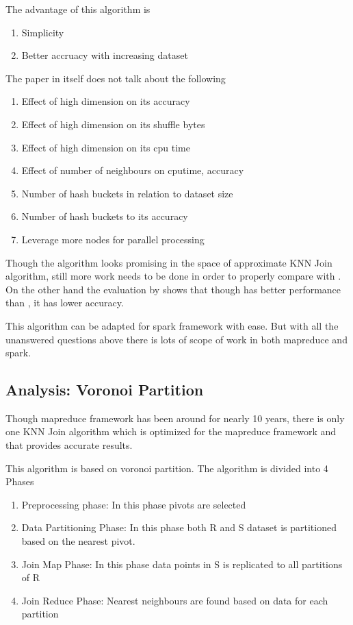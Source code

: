 \documentclass[conference]{IEEEtran}
\begin{document}
The advantage of this algorithm is
\begin{enumerate}
\item Simplicity
\item Better accruacy with increasing dataset
\end{enumerate}

\bigskip

The paper in itself does not talk about the following
\begin{enumerate}
\item Effect of high dimension on its accuracy
\item Effect of high dimension on its shuffle bytes
\item Effect of high dimension on its cpu time
\item Effect of number of neighbours on cputime, accuracy
\item Number of hash buckets in relation to dataset size
\item Number of hash buckets to its accuracy
\item Leverage more nodes for parallel processing
\end{enumerate}

Though the algorithm looks promising in the space of approximate KNN
Join algorithm, still more work needs to be done in order to properly
compare with \cite{zhang_efficient_2012}. On the other hand the
evaluation by \cite{song_solutions_2015} shows that though
\cite{zhang_efficient_2012} has better performance than
\cite{stupar_rankreduceprocessing_2010}, it has lower accuracy.

This algorithm can be adapted for spark framework with ease. But with
all the unanswered questions above there is lots of scope of work in
both mapreduce and spark.

\bigskip

\subsection{Analysis: Voronoi Partition}
Though mapreduce framework has been around for nearly 10 years, there
is only one KNN Join algorithm \cite{lu_efficient_2012} which is
optimized for the mapreduce framework and that provides accurate
results.

\medskip

This algorithm is based on voronoi partition. The algorithm is
divided into 4 Phases
\begin{enumerate}
\item Preprocessing phase: In this phase pivots are selected
\item Data Partitioning Phase: In this phase both R and S dataset is
  partitioned based on the nearest pivot.
\item Join Map Phase: In this phase data points in S is replicated to
  all partitions of R
\item Join Reduce Phase: Nearest neighbours are found based on data
  for each partition
\end{enumerate}
\end{document}
